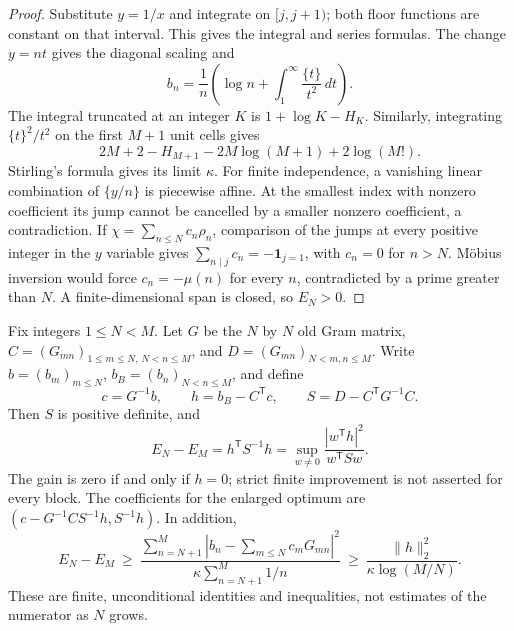 \begin{proof}
Substitute $y=1/x$ and integrate on $[j,j+1)$; both floor functions
are constant on that interval. This gives the integral and series formulas.
The change $y=nt$ gives the diagonal scaling and
\[
 b_n=\frac1n\left(\log n+\int_1^\infty\frac{\{t\}}{t^2}\,dt\right).
\]
The integral truncated at an integer $K$ is $1+\log K-H_K$.
Similarly, integrating $\{t\}^2/t^2$ on the first $M+1$ unit cells gives
\[
 2M+2-H_{M+1}-2M\log(M+1)+2\log(M!).
\]
Stirling's formula gives its limit $\kappa$. For finite independence,
a vanishing linear combination of $\{y/n\}$ is piecewise affine.
At the smallest index with nonzero coefficient its jump cannot be
cancelled by a smaller nonzero coefficient, a contradiction. If
$\chi=\sum_{n\leq N}c_n\rho_n$, comparison of the jumps at every positive
integer in the $y$ variable gives
$\sum_{n\mid j}c_n=-\mathbf 1_{j=1}$, with $c_n=0$ for $n>N$.
M\"obius inversion would force $c_n=-\mu(n)$ for every $n$, contradicted
by a prime greater than $N$. A finite-dimensional span is closed, so
$E_N>0$.
\end{proof}

\begin{proposition}
\label{prop:ns53-nb-block-gain}
Fix integers $1\leq N<M$. Let $G$ be the $N$ by $N$ old Gram matrix,
$C=(G_{mn})_{1\leq m\leq N,\,N<n\leq M}$, and
$D=(G_{mn})_{N<m,n\leq M}$.
Write $b=(b_m)_{m\leq N}$, $b_B=(b_n)_{N<n\leq M}$, and define
\begin{equation}
 c=G^{-1}b,\qquad h=b_B-C^{\mathsf T}c,\qquad
 S=D-C^{\mathsf T}G^{-1}C.
 \label{eq:ns53-nb-schur}
\end{equation}
Then $S$ is positive definite, and
\begin{equation}
 E_N-E_M=h^{\mathsf T}S^{-1}h
 =\sup_{w\ne0}\frac{|w^{\mathsf T}h|^2}{w^{\mathsf T}Sw}.
 \label{eq:ns53-nb-gain}
\end{equation}
The gain is zero if and only if $h=0$; strict finite improvement is not
asserted for every block. The coefficients for the enlarged optimum are
$(c-G^{-1}CS^{-1}h,S^{-1}h)$. In addition,
\begin{equation}
 E_N-E_M\ \geq\
 \frac{\sum_{n=N+1}^M|b_n-\sum_{m\leq N}c_mG_{mn}|^2}
 {\kappa\sum_{n=N+1}^M1/n}
 \ \geq\
 \frac{\|h\|_2^2}{\kappa\log(M/N)}.
 \label{eq:ns53-nb-trace-gain}
\end{equation}
These are finite, unconditional identities and inequalities, not estimates
of the numerator as $N$ grows.
\end{proposition}

